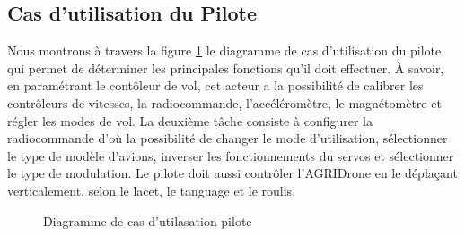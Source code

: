		\subsection{Cas d'utilisation du Pilote}
		Nous montrons à travers la figure \ref{fig:D.P} le diagramme de cas d'utilisation du pilote qui permet de déterminer les principales fonctions qu'il doit effectuer. À savoir, en paramétrant le contôleur de vol, cet acteur a la possibilité de calibrer les contrôleurs de vitesses, la radiocommande, l'accéléromètre, le magnétomètre et régler les modes de vol. La deuxième tâche consiste à configurer la radiocommande d'où la possibilité de changer le mode d'utilisation, sélectionner le type de modèle d'avions, inverser les fonctionnements du servos et sélectionner le type de modulation. Le pilote doit aussi contrôler l'AGRIDrone en le déplaçant verticalement, selon le lacet, le tanguage et le roulis.
		\begin {figure}[H] 
		\begin{center} 
			\centering
			\hspace*{-0.1cm}		
		\end{center}
		
		\caption{\label{fig:D.P}Diagramme de cas d'utilasation pilote}
		\end {figure}
		
		
